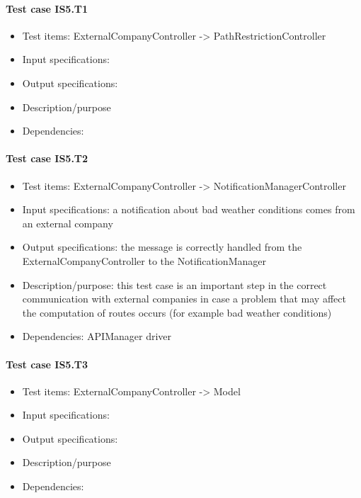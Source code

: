 \documentclass[a4paper,leqno]{article}
\begin{document}
\paragraph{Test case IS5.T1}
\begin{itemize}
	\item Test items: ExternalCompanyController -> PathRestrictionController
	\item Input specifications:
	\item Output specifications:
	\item Description/purpose
	\item Dependencies:
\end{itemize}

\paragraph{Test case IS5.T2}
\begin{itemize}
	\item Test items: ExternalCompanyController -> NotificationManagerController
	\item Input specifications: a notification about bad weather conditions comes from an external company 
	\item Output specifications: the message is correctly handled from the ExternalCompanyController to the NotificationManager
	\item Description/purpose: this test case is an important step in the correct communication with external companies in case a problem that may affect the computation of routes occurs (for example bad weather conditions)
	\item Dependencies: APIManager driver
\end{itemize}

\paragraph{Test case IS5.T3}
\begin{itemize}
	\item Test items: ExternalCompanyController -> Model
	\item Input specifications:
	\item Output specifications:
	\item Description/purpose
	\item Dependencies:
\end{itemize}
\end{document}
